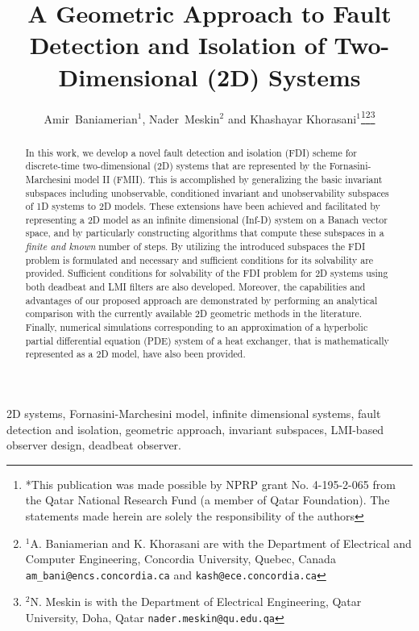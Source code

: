 \documentclass[journal,12pt,draftcls,onecolumn]{IEEEtran}
\begin{document}
\title{A Geometric Approach to Fault Detection and Isolation of Two-Dimensional (2D) Systems}


\author{Amir~Baniamerian$^{\mathrm{1}}$, Nader~Meskin$^{\mathrm{2}}$ and Khashayar Khorasani$^{\mathrm{1}}$\thanks{*This publication was made possible by NPRP grant No. 4-195-2-065 from the
Qatar National Research Fund (a member of Qatar Foundation). The
statements made herein are solely the responsibility of the authors}\thanks{$^{1}$A. Baniamerian and K. Khorasani are with the Department of Electrical and Computer Engineering,
        Concordia University, Quebec, Canada
        {\tt\small am\_bani@encs.concordia.ca} and {\tt\small kash@ece.concordia.ca}}\thanks{$^{2}$N. Meskin is with the Department of Electrical Engineering, Qatar University,
        Doha, Qatar
        {\tt\small nader.meskin@qu.edu.qa}}}


\maketitle

\begin{abstract}
In this work, we develop a novel fault detection and isolation (FDI) scheme for discrete-time two-dimensional (2D) systems that are represented by the Fornasini-Marchesini model II (FMII). This is accomplished by generalizing the  basic invariant subspaces including unobservable, conditioned invariant and unobservability subspaces of 1D systems to 2D models. These extensions have been achieved and facilitated by representing a 2D model as an infinite dimensional (Inf-D) system  on a Banach vector space, and by particularly constructing algorithms that compute these subspaces in a \emph{finite and known} number of steps. By utilizing the introduced subspaces the FDI problem is formulated and necessary and sufficient conditions for its solvability are provided. Sufficient conditions for solvability of the FDI problem for 2D systems using both deadbeat and LMI filters are also developed. Moreover, the capabilities and advantages of our proposed approach are demonstrated  by performing  an analytical comparison with the currently available 2D geometric methods in the literature. Finally, numerical simulations corresponding to an approximation of a hyperbolic partial differential equation (PDE)  system of a heat exchanger, that is mathematically represented as a 2D model, have also been provided. \end{abstract}

\begin{IEEEkeywords}
2D systems, Fornasini-Marchesini model, infinite dimensional systems, fault detection and isolation, geometric approach, invariant subspaces, LMI-based observer design, deadbeat observer.
\end{IEEEkeywords}
\end{document}
